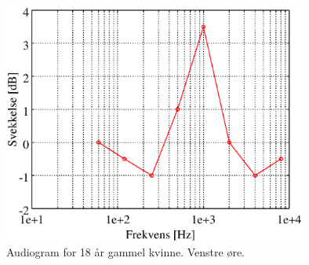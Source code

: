 \documentclass[norsk, twocolumn,letterpaper,11pt,fleqn]{extarticle}
\begin{document}
\begin{figure}[h!]
	\centering
	\includegraphics[width=100mm]{leftear18.eps}
	\caption[]{Audiogram for 18 år gammel kvinne. Venstre øre.}
	\label{fig:11}
\end{figure}
\end{document}
